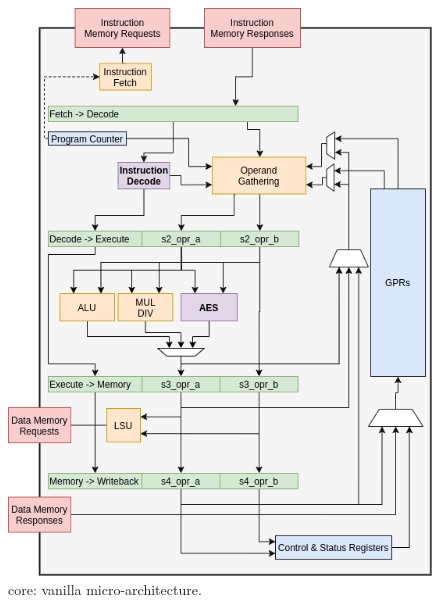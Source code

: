 
\vspace*{\fill}

\begin{figure}[!h]
\centering
\includegraphics[scale={0.45},angle={90}]{diagrams/scarv-cpu-uarch.png}
\caption{
   core: vanilla  micro-architecture.
}
\label{fig:core:2:normal}
\end{figure}

